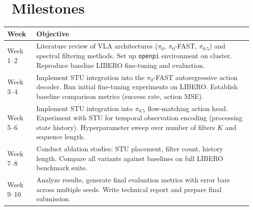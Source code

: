 \documentclass[10pt, letterpaper]{article}
\begin{document}
\section*{\faCalendar\ Milestones}
\begin{tabularx}{\textwidth}{@{}lX@{}}
    \toprule
    \textbf{Week} & \textbf{Objective} \\
    \midrule
    Week 1--2  & Literature review of VLA architectures ($\pi_0$, $\pi_0$-FAST, $\pi_{0.5}$) and spectral filtering methods. Set up \texttt{openpi} environment on cluster. Reproduce baseline LIBERO fine-tuning and evaluation. \\
    Week 3--4 & Implement STU integration into the $\pi_0$-FAST autoregressive action decoder. Run initial fine-tuning experiments on LIBERO. Establish baseline comparison metrics (success rate, action MSE). \\
    Week 5--6 & Implement STU integration into $\pi_{0.5}$ flow-matching action head. Experiment with STU for temporal observation encoding (processing state history). Hyperparameter sweep over number of filters $K$ and sequence length. \\
    Week 7--8 & Conduct ablation studies: STU placement, filter count, history length. Compare all variants against baselines on full LIBERO benchmark suite. \\
    Week 9--10 & Analyze results, generate final evaluation metrics with error bars across multiple seeds. Write technical report and prepare final submission. \\
    \bottomrule
\end{tabularx}
\end{document}
